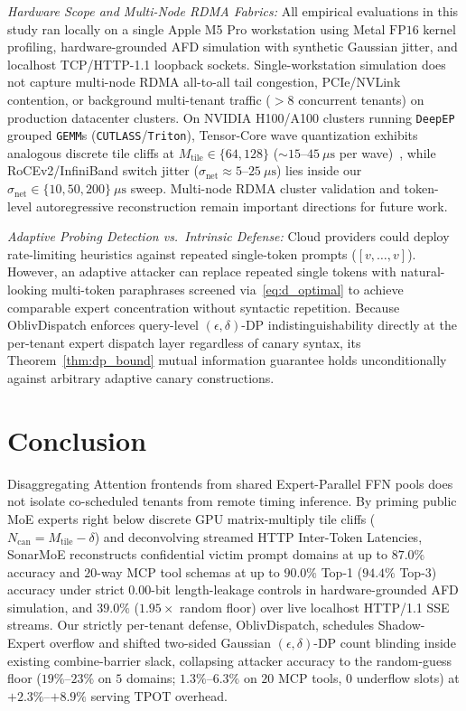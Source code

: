 \documentclass[10pt,journal,compsoc]{IEEEtran}
\def\SM{SonarMoE}%
\def\OD{OblivDispatch}%
\theoremstyle{definition}
\theoremstyle{remark}
\newcommand{\SM}{\textsc{SonarMoE}}
\newcommand{\OD}{\textsc{OblivDispatch}}
\begin{document}
\emph{Hardware Scope and Multi-Node RDMA Fabrics:} All empirical evaluations in this study ran locally on a single Apple M5 Pro workstation using Metal $\mathrm{FP16}$ kernel profiling, hardware-grounded AFD simulation with synthetic Gaussian jitter, and localhost TCP/HTTP-1.1 loopback sockets. Single-workstation simulation does not capture multi-node RDMA all-to-all tail congestion, PCIe/NVLink contention, or background multi-tenant traffic ($>8$ concurrent tenants) on production datacenter clusters. On NVIDIA H100/A100 clusters running \texttt{DeepEP}~\cite{zhao2025deepep} grouped \texttt{GEMM}s (\texttt{CUTLASS}/\texttt{Triton}), Tensor-Core wave quantization exhibits analogous discrete tile cliffs at $M_{\mathrm{tile}} \in \{64, 128\}$ ($\sim 15$--$45~\mu\mathrm{s}$ per wave)~\cite{tan2025gpugemmcliff}, while RoCEv2/InfiniBand switch jitter ($\sigma_{\mathrm{net}} \approx 5$--$25~\mu\mathrm{s}$) lies inside our $\sigma_{\mathrm{net}} \in \{10, 50, 200\}~\mu\mathrm{s}$ sweep. Multi-node RDMA cluster validation and token-level autoregressive reconstruction remain important directions for future work.

\emph{Adaptive Probing Detection vs.\ Intrinsic Defense:} Cloud providers could deploy rate-limiting heuristics against repeated single-token prompts ($[v, \dots, v]$). However, an adaptive attacker can replace repeated single tokens with natural-looking multi-token paraphrases screened via~\eqref{eq:d_optimal} to achieve comparable expert concentration without syntactic repetition. Because \OD{} enforces query-level $(\epsilon, \delta)$-DP indistinguishability directly at the per-tenant expert dispatch layer regardless of canary syntax, its Theorem~\ref{thm:dp_bound} mutual information guarantee holds unconditionally against arbitrary adaptive canary constructions.

\section{Conclusion}\label{sec:conclusion}

Disaggregating Attention frontends from shared Expert-Parallel FFN pools does not isolate co-scheduled tenants from remote timing inference. By priming public MoE experts right below discrete GPU matrix-multiply tile cliffs ($N_{\mathrm{can}} = M_{\mathrm{tile}} - \delta$) and deconvolving streamed HTTP Inter-Token Latencies, \SM{} reconstructs confidential victim prompt domains at up to $87.0\%$ accuracy and $20$-way MCP tool schemas at up to $90.0\%$ Top-1 ($94.4\%$ Top-3) accuracy under strict $0.00$-bit length-leakage controls in hardware-grounded AFD simulation, and $39.0\%$ ($1.95\times$ random floor) over live localhost HTTP/1.1 SSE streams. Our strictly per-tenant defense, \OD{}, schedules Shadow-Expert overflow and shifted two-sided Gaussian $(\epsilon, \delta)$-DP count blinding inside existing combine-barrier slack, collapsing attacker accuracy to the random-guess floor ($19\%$--$23\%$ on $5$ domains; $1.3\%$--$6.3\%$ on $20$ MCP tools, $0$ underflow slots) at $+2.3\%$--$+8.9\%$ serving $\mathrm{TPOT}$ overhead.
\end{document}
